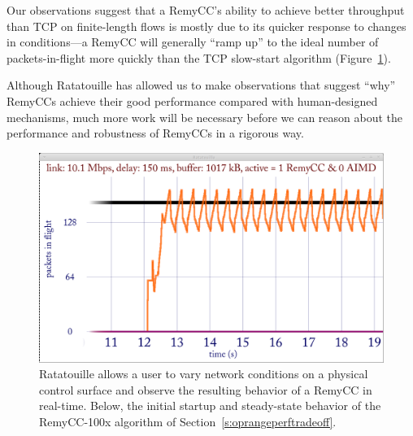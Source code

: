 Our observations suggest that a RemyCC's ability to achieve better
throughput than TCP on finite-length flows is mostly due to its
quicker response to changes in conditions---a RemyCC will generally
``ramp up'' to the ideal number of packets-in-flight more quickly than
the TCP slow-start algorithm (Figure~\ref{fig:ratscreen}).

Although Ratatouille has allowed us to make observations that suggest
``why'' RemyCCs achieve their good performance compared with
human-designed mechanisms, much more work will be necessary before we
can reason about the performance and robustness of RemyCCs in a
rigorous way.

\begin{figure}
\caption{Ratatouille allows a user to vary network conditions on a
  physical control surface and observe the resulting behavior of a
  RemyCC in real-time. Below, the initial startup and steady-state
  behavior of the RemyCC-100x algorithm of Section~\ref{s:oprangeperftradeoff}.}
\label{fig:ratscreen}

\begin{center}

\includegraphics[width=0.85 \textwidth]{ratatouille.png}

\end{center}
\end{figure}
